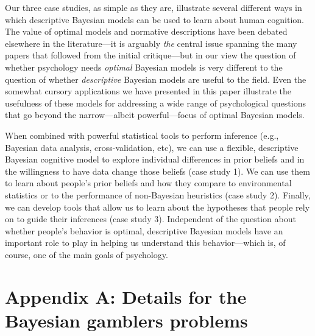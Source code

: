 \documentclass[doc,floatsintext]{apa6}
\begin{document}
Our three case studies, as simple as they are, illustrate several different ways in which descriptive Bayesian models can be used to learn about human cognition. The value of optimal models and normative descriptions have been debated elsewhere in the literature---it is arguably {\it the} central issue spanning the many papers that followed from the initial  critique---but in our view the question of whether psychology needs {\it optimal} Bayesian models is very different to the question of whether {\it descriptive} Bayesian models are useful to the field.
Even the somewhat cursory applications we have presented in this paper illustrate the usefulness of these models for addressing a wide range of psychological questions that go beyond the narrow---albeit powerful---focus of optimal Bayesian models.

When combined with powerful statistical tools to perform inference (e.g., Bayesian data analysis, cross-validation, etc), we can use a flexible, descriptive Bayesian cognitive model to explore individual differences in prior beliefs and in the willingness to have data change those beliefs (case study 1). We can use them to learn about people's prior beliefs and how they compare to environmental statistics or to the performance of non-Bayesian heuristics (case study 2). Finally, we can develop tools that allow us to learn about the hypotheses that people rely on to guide their inferences (case study 3). Independent of the question about whether people's behavior is optimal, descriptive Bayesian models have an important role to play in helping us understand this behavior---which is, of course, one of the main goals of psychology.







\section*{Appendix A: Details for the Bayesian gamblers problems}
\end{document}
